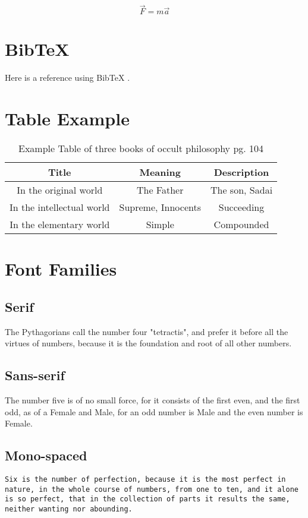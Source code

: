 \documentclass{article}
\begin{document}
\begin{equation}
    \vec{F} = m \vec{a}
\end {equation} 

\section{BibTeX}
Here is a reference using BibTeX \citep{OccultPhilosophy}.

\section{Table Example}
\begin{table}[h]
    \centering
    \begin{tabular}{|c|c|c|}
    \hline
    \textbf{Title} & \textbf{Meaning} & \textbf{Description} \\
    \hline
    In the original world & The Father & The son, Sadai \\
    In the intellectual world & Supreme, Innocents & Succeeding \\
    In the elementary world & Simple & Compounded \\
    \hline
    \end{tabular}
    \caption{Example Table of three books of occult philosophy pg. 104}
    \label{tab:example}
\end{table}

\section{Font Families}
\subsection{Serif}
The Pythagorians call the number four "tetractis", and prefer it before all the virtues of numbers, because it is the foundation and root of all other numbers.

\subsection{Sans-serif}
\textsf{The number five is of no small force, for it consists of the first even, and the first odd, as of a Female and Male, for an odd number is Male and the even number is Female.}

\subsection{Mono-spaced}
\texttt{Six is the number of perfection, because it is the most perfect in nature, in the whole course of numbers, from one to ten, and it alone is so perfect, that in the collection of parts it results the same, neither wanting nor abounding.}
\end{document}
